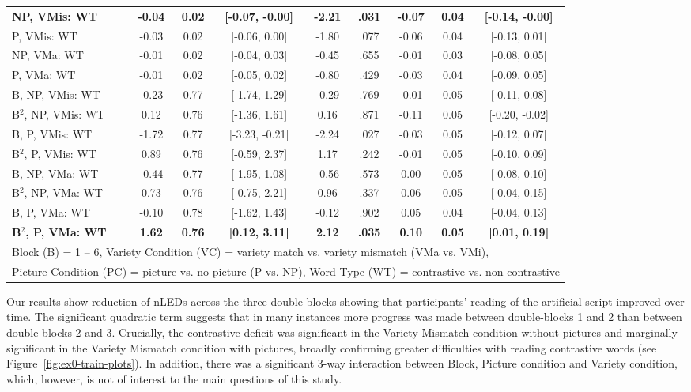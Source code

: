 \documentclass[doc,floatsintext]{apa6}
\begin{document}
\begin{table}[!h]
{\begin{tabular}{lcccccccc}
\textbf{NP, VMis: WT} & \textbf{-0.04} & \textbf{0.02} & \textbf{[-0.07, -0.00]} & \textbf{-2.21} & \textbf{.031} & \textbf{-0.07} & \textbf{0.04} & \textbf{[-0.14, -0.00]}\\
P, VMis: WT & -0.03 & 0.02 & [-0.06, 0.00] & -1.80 & .077 & -0.06 & 0.04 & [-0.13, 0.01]\\
NP, VMa: WT & -0.01 & 0.02 & [-0.04, 0.03] & -0.45 & .655 & -0.01 & 0.03 & [-0.08, 0.05]\\
P, VMa: WT & -0.01 & 0.02 & [-0.05, 0.02] & -0.80 & .429 & -0.03 & 0.04 & [-0.09, 0.05]\\
B, NP, VMis: WT & -0.23 & 0.77 & [-1.74, 1.29] & -0.29 & .769 & -0.01 & 0.05 & [-0.11, 0.08]\\
B$^2$, NP, VMis: WT & 0.12 & 0.76 & [-1.36, 1.61] & 0.16 & .871 & -0.11 & 0.05 & [-0.20, -0.02]\\
B, P, VMis: WT & -1.72 & 0.77 & [-3.23, -0.21] & -2.24 & .027 & -0.03 & 0.05 & [-0.12, 0.07]\\
B$^2$, P, VMis: WT & 0.89 & 0.76 & [-0.59, 2.37] & 1.17 & .242 & -0.01 & 0.05 & [-0.10, 0.09]\\
B, NP, VMa: WT & -0.44 & 0.77 & [-1.95, 1.08] & -0.56 & .573 & 0.00 & 0.05 & [-0.08, 0.10]\\
B$^2$, NP, VMa: WT & 0.73 & 0.76 & [-0.75, 2.21] & 0.96 & .337 & 0.06 & 0.05 & [-0.04, 0.15]\\
B, P, VMa: WT & -0.10 & 0.78 & [-1.62, 1.43] & -0.12 & .902 & 0.05 & 0.04 & [-0.04, 0.13]\\
\textbf{B$^2$, P, VMa: WT} & \textbf{1.62} & \textbf{0.76} & \textbf{[0.12, 3.11]} & \textbf{2.12} & \textbf{.035} & \textbf{0.10} & \textbf{0.05} & \textbf{[0.01, 0.19]}\\
\bottomrule
\multicolumn{9}{l}{Block (B) = 1 -- 6, Variety Condition (VC) = variety match vs. variety mismatch (VMa vs. VMi),}\\
\multicolumn{9}{l}{Picture Condition (PC) = picture vs. no picture (P vs. NP), Word Type (WT) = contrastive vs. non-contrastive}\\
\end{tabular}}
\end{table}

Our results show reduction of nLEDs across the three double-blocks
showing that participants' reading of the artificial script improved
over time. The significant quadratic term suggests that in many
instances more progress was made between double-blocks 1 and 2 than
between double-blocks 2 and 3. Crucially, the contrastive deficit was
significant in the Variety Mismatch condition without pictures and
marginally significant in the Variety Mismatch condition with pictures,
broadly confirming greater difficulties with reading contrastive words
(see Figure~\ref{fig:ex0-train-plots}). In addition, there was a
significant 3-way interaction between Block, Picture condition and
Variety condition, which, however, is not of interest to the main
questions of this study.
\end{document}
